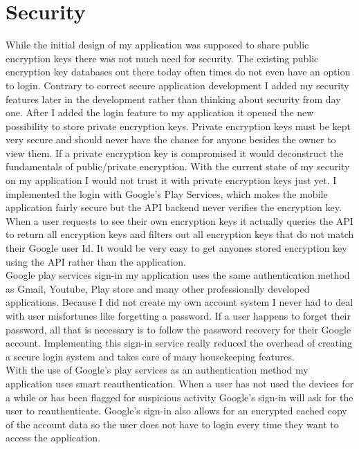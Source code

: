 \documentclass[letterpaper,12pt,notitlepage,fleqn]{article}
\begin{document}
\section{Security}
\indent While the initial design of my application was supposed to share public encryption keys there was not much need for security. The existing public encryption key databases out there today often times do not even have an option to login. Contrary to correct secure application development I added my security features later in the development rather than thinking about security from day one. After I added the login feature to my application it opened the new possibility to store private
encryption keys. Private encryption keys must be kept very secure and should never have the chance for anyone besides the owner to view them. If a private encryption key is compromised it would deconstruct the fundamentals of public/private encryption. With the current state of my security on my application I would not trust it with private encryption keys just yet. I implemented the login with Google's Play Services, which makes the mobile application fairly secure but the API backend
never verifies the encryption key. When a user requests to see their own encryption keys it actually queries the API to return all encryption keys and filters out all encryption keys that do not match their Google user Id. It would be very easy to get anyones stored encryption key using the API rather than the application.
\\
\indent Google play services sign-in my application uses the same authentication method as Gmail, Youtube, Play store and many other professionally developed applications. Because I did not create my own account system I never had to deal with user misfortunes like forgetting a password. If a user happens to forget their password, all that is necessary is to follow the password recovery for their Google account. Implementing this sign-in service really reduced the overhead of creating a
secure login system and takes care of many housekeeping features. 
\\
\indent With the use of Google's play services as an authentication method my application uses smart reauthentication. When a user has not used the devices for a while or has been flagged for suspicious activity Google's sign-in will ask for the user to reauthenticate. Google's sign-in also allows for an encrypted cached copy of the account data so the user does not have to login every time they want to access the application. 
\end{document}
